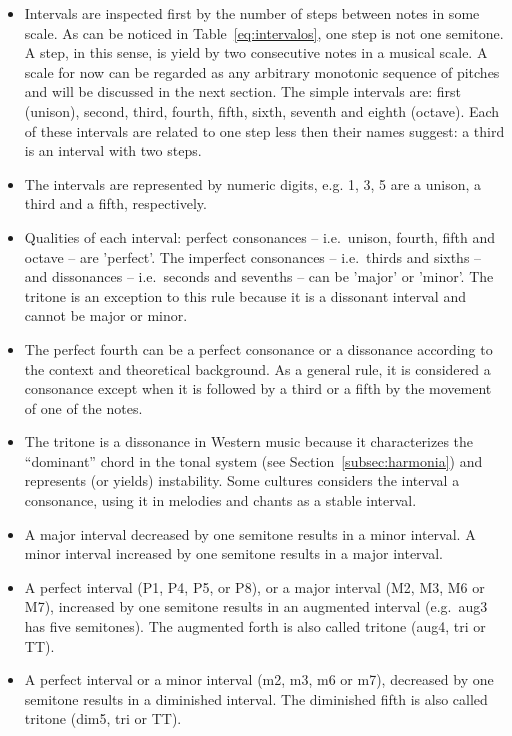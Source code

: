 \begin{itemize}
	\item Intervals are inspected first by the number of steps between notes in some scale.
		As can be noticed in Table~\ref{eq:intervalos}, one step is not one semitone.
		A step, in this sense, is yield by two consecutive notes in a musical scale.
		A scale for now can be regarded as any arbitrary monotonic sequence of pitches and will be discussed in the next section.
		The simple intervals are: first (unison), second, third, fourth, fifth, sixth, seventh and eighth (octave).
		Each of these intervals are related to one step less then their names suggest: a third is an interval with two steps.
	\item The intervals are represented by numeric digits, e.g. 1, 3, 5 are a unison, a third and a fifth, respectively.
	\item Qualities of each interval: perfect consonances --
                i.e.\ unison, fourth, fifth and octave -- are 'perfect'.
		The imperfect consonances -- i.e.\ thirds and sixths -- and dissonances -- i.e.\ seconds and sevenths -- can be 'major' or 'minor'.
		The tritone is an exception to this rule because it is a dissonant interval and cannot be major or minor.
	\item The perfect fourth can be a perfect consonance or a dissonance according to the context and theoretical background.
		As a general rule, it is considered a consonance except when it is followed by a third or a fifth
		by the movement of one of the notes.
	\item The tritone is a dissonance in Western music because
		it characterizes the ``dominant'' chord in the tonal system (see Section~\ref{subsec:harmonia}) and represents (or yields) instability. Some cultures considers the interval a consonance, using it in melodies and chants as a stable interval.
	\item A major interval decreased by one semitone results in a minor interval. A minor interval increased by one semitone results in a major interval.
	\item A perfect interval (P1, P4, P5, or P8), or a major interval (M2, M3, M6 or M7), increased
by one semitone results in an augmented interval (e.g.\
aug3 has five semitones). The augmented forth
is also called tritone (aug4, tri or TT).
	\item A perfect interval or a minor interval (m2, m3, m6 or m7), decreased by one semitone results in a diminished interval. The
diminished fifth is also called tritone (dim5, tri or TT).


\end{itemize}
